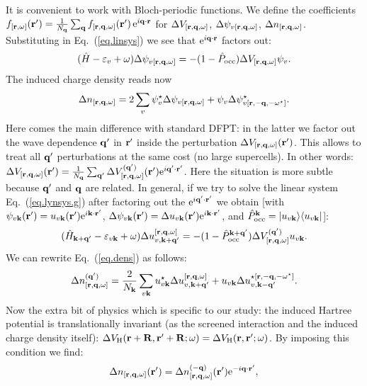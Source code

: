 \documentclass[twocolumn,prb,showpacs,superscriptaddress]{revtex4}
\def\w{\omega}
\def\>{\rangle}
\def\<{\langle}
\def\H{\hat{H}}
\def\P{\hat{P}_{\rm occ}}
\def\E{\varepsilon}
\def\q{{\bf q}}
\def\k{{\bf k}}
\def\qp{{\bf q^\prime}}
\def\r{{\bf r}}
\def\rp{{\bf r^\prime}}
\begin{document}
It is convenient to work with Bloch-periodic functions.
We define the coefficients
$f_{[\r,\w]}(\rp) = \frac{1}{N_\q}\sum_\q f_{[\r,\q,\w]}(\rp) \, {\rm e}^{i\q\cdot\r}$
for $\Delta V_{[\r,\q,\w]}$, $\Delta\psi_{v[\r,\q,\w]}$, $\Delta n_{[\r,\q,\w]}$.
Substituting in Eq.\ (\ref{eq.linsys}) we see that ${\rm e}^{i\q\cdot\r}$ factors out:
  \begin{equation}\label{eq.lynsys.g}
  (\H-\E_v+\w) \Delta \psi_{v[\r,\q,\w]}  =  -(1-\P)  \Delta V_{[\r,\q,\w]} \psi_v.
  \end{equation}
The induced charge density reads now
  \begin{equation}\label{eq.dens}
  \Delta n_{[\r,\q,\w]} = 2\sum_v \psi_v^\star \Delta \psi_{v[\r,\q,\w]} +
      \psi_v \Delta \psi^\star_{v[\r,-\q,-\w^\star]} .
  \end{equation}
Here comes the main difference with standard DFPT: in the latter we factor out
the wave dependence $\qp$ in $\rp$ inside the perturbation $\Delta V_{[\r,\q,\w]}(\rp)$.
This allows to treat all $\qp$ perturbations at the same cost (no large supercells).
In other words: $\Delta V_{[\r,\q,\w]}(\rp)=\frac{1}{N_\q}\sum_\qp \Delta V_{[\r,\q,\w]}^{(\qp)}(\rp) {\rm e}^{i\qp\cdot\rp}$.
Here the situation is more subtle because $\qp$ and $\q$ are related.
In general, if we try to solve the linear system Eq.\ (\ref{eq.lynsys.g}) after factoring out the ${\rm e}^{i\qp\cdot\rp}$
we obtain [with $\psi_{v\k}(\rp)=u_{v\k}(\rp){\rm e}^{i\k\cdot\rp}$,
$\Delta\psi_{v\k}(\rp)=\Delta u_{v\k}(\rp){\rm e}^{i\k\cdot\rp}$,
and $\P^\k=|u_{v\k}\>\<u_{v\k}|$]:
  \begin{equation}\label{eq.linsys.bloch}
  (\H_{\k+\qp}-\E_{v\k}+\w) \Delta u_{v,\k+\qp}^{[\r,\q,\w]}  =  
  -(1-\P^{\k+\qp})  \Delta V_{[\r,\q,\w]}^{(\qp)} u_{v\k}.
  \end{equation}
We can rewrite Eq.\ (\ref{eq.dens}) as follows:
  \begin{equation}\label{eq.deltarho.qprime}
  \Delta n_{[\r,\q,\w]}^{(\qp)} = \frac{2}{N_\k}\sum_{v\k} u_{v\k}^\star \Delta u_{v,\k+\qp}^{[\r,\q,\w]} +
      u_{v\k} \Delta u_{v,\k-\qp}^{\star[\r,-\q,-\w^\star]} .
  \end{equation}
Now the extra bit of physics which is specific to our study: the induced
Hartree potential is translationally invariant (as the screened interaction
and the induced charge density itself): $\Delta V_{\rm H}(\r+{\bf R},\rp+{\bf R};\w)=\Delta V_{\rm H}(\r,\rp;\w)$.
By imposing this condition we find:
  \begin{equation}
  \Delta n_{[\r,\q,\w]}(\rp) %
  = \Delta n_{[\r,\q,\w]}^{(-\q)}(\rp) {\rm e}^{-i\q\cdot\rp},
  \end{equation}
\end{document}
